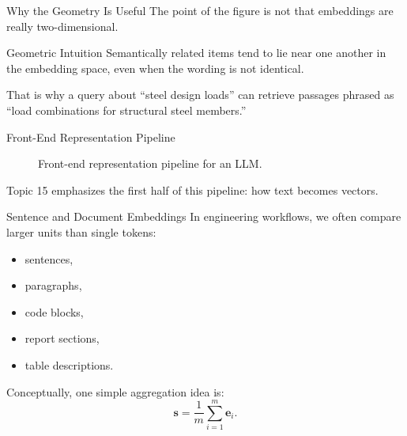 \documentclass[12pt]{beamer}
\begin{document}
\begin{frame}{Why the Geometry Is Useful}
  The point of the figure is not that embeddings are really two-dimensional.

  \begin{conceptbox}{Geometric Intuition}
    Semantically related items tend to lie near one another in the embedding space, even when the wording is not identical.
  \end{conceptbox}

  That is why a query about ``steel design loads'' can retrieve passages phrased as ``load combinations for structural steel members.''
\end{frame}

\begin{frame}{Front-End Representation Pipeline}
  \begin{figure}
    \centering
    \caption{Front-end representation pipeline for an LLM.}
  \end{figure}

  Topic 15 emphasizes the first half of this pipeline: how text becomes vectors.
\end{frame}

\begin{frame}{Sentence and Document Embeddings}
  In engineering workflows, we often compare larger units than single tokens:
  \begin{itemize}
    \item sentences,
    \item paragraphs,
    \item code blocks,
    \item report sections,
    \item table descriptions.
  \end{itemize}

  Conceptually, one simple aggregation idea is:
  \[
    \mathbf{s}=\frac{1}{m}\sum_{i=1}^{m}\mathbf{e}_i.
  \]
\end{frame}
\end{document}
